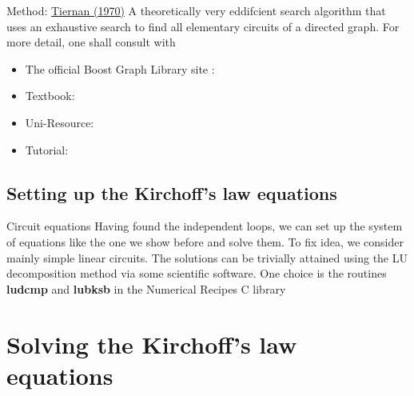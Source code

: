 \documentclass[xcolor=dvipsnames]{beamer}
\begin{document}
\begin{frame}{Method: \href{https://dl.acm.org/doi/pdf/10.1145/362814.362819}{Tiernan (1970)}}
	A theoretically very eddifcient search algorithm that uses an exhaustive search to find all elementary circuits of a directed graph.  
	For more detail, one shall consult with 
	\begin{itemize}
		\item The official Boost Graph Library site : \href{https://www.boost.org/doc/libs/1_66_0/libs/graph/doc/quick_tour.html}{}
		\item Textbook: \href{https://www.amazon.ca/Boost-Graph-Library-Reference-Depth-ebook/dp/B00403MNUI}{}
		\item Uni-Resource: \href{http://cs.brown.edu/~jwicks/boost/libs/graph/doc/index.html}{}
		\item Tutorial: \href{https://www.technical-recipes.com/2015/getting-started-with-the-boost-graph-library}{}
	\end{itemize}
\end{frame}



\subsection{Setting up the Kirchoff's law equations}

\begin{frame}{Circuit equations}
	Having found the independent loops, we can set up the system of equations like the one we show before and solve them. To fix idea,
	we consider mainly simple linear circuits. The solutions can be trivially attained using the LU decomposition method via some scientific software. 
	One choice is the routines \textbf{ludcmp} and \textbf{lubksb} in the Numerical Recipes C library
\end{frame}

\section{Solving the Kirchoff's law equations}
\end{document}
